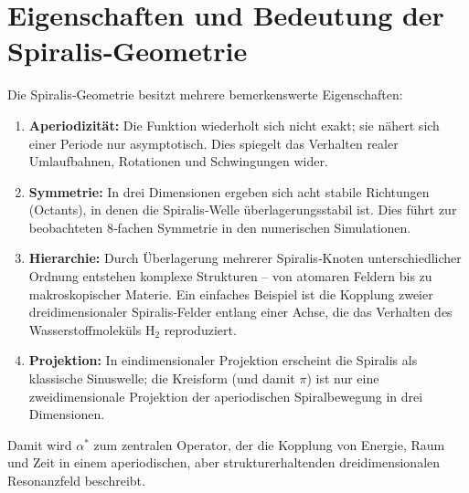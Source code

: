 \section{Eigenschaften und Bedeutung der Spiralis‐Geometrie}

Die Spiralis‐Geometrie besitzt mehrere bemerkenswerte Eigenschaften:

\begin{enumerate}
\item \textbf{Aperiodizität:}
Die Funktion wiederholt sich nicht exakt;
sie nähert sich einer Periode nur asymptotisch.
Dies spiegelt das Verhalten realer Umlaufbahnen,
Rotationen und Schwingungen wider.

\item \textbf{Symmetrie:}
In drei Dimensionen ergeben sich acht stabile Richtungen
(Octants), in denen die Spiralis‐Welle
überlagerungsstabil ist.
Dies führt zur beobachteten 8‐fachen Symmetrie
in den numerischen Simulationen.

\item \textbf{Hierarchie:}
Durch Überlagerung mehrerer Spiralis‐Knoten
unterschiedlicher Ordnung entstehen komplexe Strukturen
– von atomaren Feldern bis zu makroskopischer Materie.
Ein einfaches Beispiel ist die Kopplung zweier
dreidimensionaler Spiralis‐Felder entlang einer Achse,
die das Verhalten des Wasserstoffmoleküls H$_2$ reproduziert.

\item \textbf{Projektion:}
In eindimensionaler Projektion
erscheint die Spiralis als klassische Sinuswelle;
die Kreisform (und damit $\pi$) ist
nur eine zweidimensionale Projektion
der aperiodischen Spiralbewegung in drei Dimensionen.
\end{enumerate}

Damit wird $\alpha^*$ zum zentralen Operator,
der die Kopplung von Energie, Raum und Zeit
in einem aperiodischen, aber strukturerhaltenden
dreidimensionalen Resonanzfeld beschreibt.
